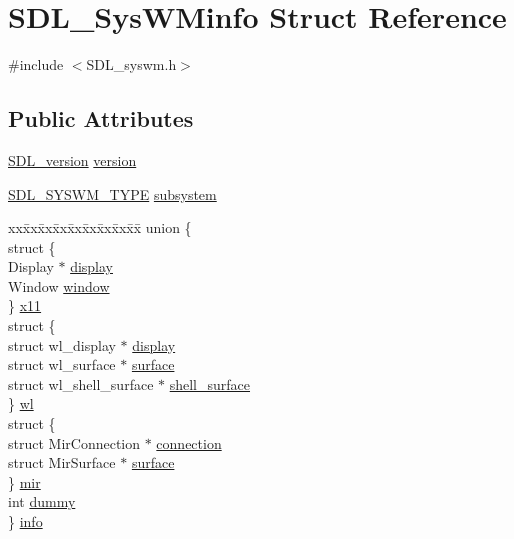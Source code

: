 \hypertarget{struct_s_d_l___sys_w_minfo}{}\section{S\+D\+L\+\_\+\+Sys\+W\+Minfo Struct Reference}
\label{struct_s_d_l___sys_w_minfo}


{\ttfamily \#include $<$S\+D\+L\+\_\+syswm.\+h$>$}

\subsection*{Public Attributes}
\begin{DoxyCompactItemize}
\item 
\hyperlink{struct_s_d_l__version}{S\+D\+L\+\_\+version} \hyperlink{struct_s_d_l___sys_w_minfo_ac3a70af022d4849e9ff546595e94627f}{version}
\item 
\hyperlink{_s_d_l__syswm_8h_a064c26598287280fff2a00d6758ac4f7}{S\+D\+L\+\_\+\+S\+Y\+S\+W\+M\+\_\+\+T\+Y\+PE} \hyperlink{struct_s_d_l___sys_w_minfo_a438b6a06ab3ee417293c7b7fc5a23855}{subsystem}
\item 
\begin{tabbing}
xx\=xx\=xx\=xx\=xx\=xx\=xx\=xx\=xx\=\kill
union \{\\
\>struct \{\\
\>\>Display $\ast$ \hyperlink{struct_s_d_l___sys_w_minfo_a58ef8bc8e1065e95e75a08d08f4a4741}{display}\\
\>\>Window \hyperlink{struct_s_d_l___sys_w_minfo_a83ca4b0f4bdf67a0edee03d5bde86b93}{window}\\
\>\} \hyperlink{struct_s_d_l___sys_w_minfo_a00ee462de755dce0807b5a9f8a2be12b}{x11}\\
\>struct \{\\
\>\>struct wl\_display $\ast$ \hyperlink{struct_s_d_l___sys_w_minfo_a148aa67e71b758f6930165fbc027e2b2}{display}\\
\>\>struct wl\_surface $\ast$ \hyperlink{struct_s_d_l___sys_w_minfo_a24a91614de4a63682f391f38c7ebb7a2}{surface}\\
\>\>struct wl\_shell\_surface $\ast$ \hyperlink{struct_s_d_l___sys_w_minfo_a599f8ae7807209c4160fd6580015e2a3}{shell\_surface}\\
\>\} \hyperlink{struct_s_d_l___sys_w_minfo_a01771013639d6a279d7dfd505e7d3cc0}{wl}\\
\>struct \{\\
\>\>struct MirConnection $\ast$ \hyperlink{struct_s_d_l___sys_w_minfo_a7fda623f016c075e04e3a377379c2d0f}{connection}\\
\>\>struct MirSurface $\ast$ \hyperlink{struct_s_d_l___sys_w_minfo_a64be25cebed485710779046f19f93cca}{surface}\\
\>\} \hyperlink{struct_s_d_l___sys_w_minfo_afa9c65b25f823478a1aa967d24c54326}{mir}\\
\>int \hyperlink{struct_s_d_l___sys_w_minfo_a1edbb8fc4fc59081efe6070f9167c1cf}{dummy}\\
\} \hyperlink{struct_s_d_l___sys_w_minfo_ab928935e7f73776e61ecc4c169a146f2}{info}\\


\end{tabbing}
\end{DoxyCompactItemize}
